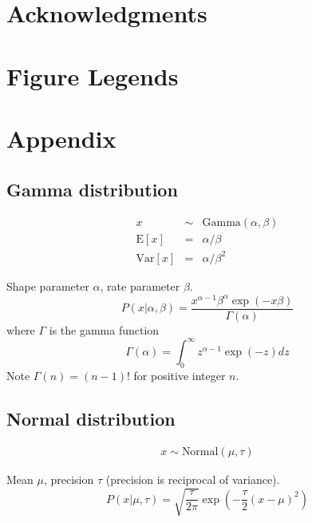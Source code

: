 \documentclass[10pt]{article}
\begin{document}
\newpage
\section{Acknowledgments}



\clearpage
\section{Figure Legends}

\clearpage
\section{Appendix}

\subsection{Gamma distribution}

\begin{eqnarray*}
x & \sim & \mbox{Gamma}(\alpha,\beta) \\
\mbox{E}[x] & = & \alpha/\beta \\
\mbox{Var}[x] & = & \alpha/\beta^2
\end{eqnarray*}

Shape parameter $\alpha$, rate parameter $\beta$.
\[
P(x|\alpha,\beta) = \frac{x^{\alpha-1} \beta^\alpha \exp(-x \beta)}{\Gamma(\alpha)}
\]
where $\Gamma$ is the gamma function
\[
\Gamma(\alpha) = \int_0^{\infty} z^{\alpha-1} \exp(-z) dz
\]
Note $\Gamma(n) = (n-1)!$ for positive integer $n$.

\subsection{Normal distribution}

\begin{eqnarray*}
x \sim \mbox{Normal}(\mu,\tau)
\end{eqnarray*}


Mean $\mu$, precision $\tau$ (precision is reciprocal of variance).
\[
P(x|\mu,\tau)
 = \sqrt{\frac{\tau}{2\pi}} \exp \left( -\frac{\tau}{2}(x-\mu)^2 \right)
\]
\end{document}

